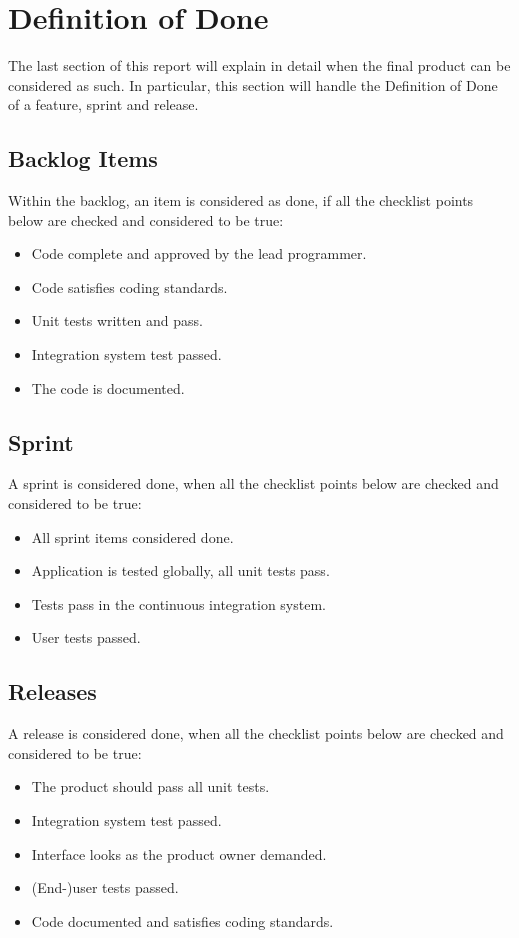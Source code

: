 \documentclass[11pt,twoside,a4paper]{article}
\begin{document}
\newpage

\section{Definition of Done}
The last section of this report will explain in detail when the final product can be considered as such. In particular, this section will handle the Definition of Done of a feature, sprint and release.


\subsection{Backlog Items}
Within the backlog, an item is considered as done, if all the checklist points below are checked and considered to be true:

\begin{itemize}
	\item Code complete and approved by the lead programmer.
	\item Code satisfies coding standards.
	\item Unit tests written and pass.
	\item Integration system test passed.
	\item The code is documented.
\end{itemize}


\subsection{Sprint}
A sprint is considered done, when all the checklist points below are checked and considered to be true:

\begin{itemize}
	\item All sprint items considered done.
	\item Application is tested globally, all unit tests pass.
	\item Tests pass in the continuous integration system.
	\item User tests passed.
\end{itemize}


\subsection{Releases}
A release is considered done, when all the checklist points below are checked and considered to be true:

\begin{itemize}
	\item The product should pass all unit tests.
	\item Integration system test passed.
	\item Interface looks as the product owner demanded.
	\item (End-)user tests passed.
	\item Code documented and satisfies coding standards.
\end{itemize}
\end{document}
